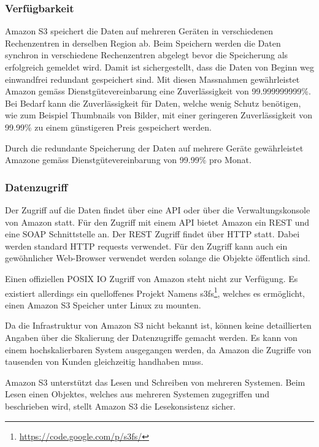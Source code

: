 \subsubsection*{Verfügbarkeit}
Amazon S3 speichert die Daten auf mehreren Geräten in verschiedenen Rechenzentren in derselben Region ab. Beim Speichern werden die Daten synchron in verschiedene Rechenzentren abgelegt bevor die Speicherung als erfolgreich gemeldet wird. Damit ist sichergestellt, dass die Daten von Beginn weg einwandfrei redundant gespeichert sind. Mit diesen Massnahmen gewährleistet Amazon gemäss Dienstgütevereinbarung eine Zuverlässigkeit von 99.999999999\%. Bei Bedarf kann die Zuverlässigkeit für Daten, welche wenig Schutz benötigen, wie zum Beispiel Thumbnails von Bilder, mit einer geringeren Zuverlässigkeit von 99.99\% zu einem günstigeren Preis gespeichert werden. \cite{Amazon2007}

Durch die redundante Speicherung der Daten auf mehrere Geräte gewährleistet Amazone gemäss Dienstgütevereinbarung von 99.99\% pro Monat.

\subsubsection*{Datenzugriff}
Der Zugriff auf die Daten findet über eine API oder über die Verwaltungskonsole von Amazon statt. Für den Zugriff mit einem API bietet Amazon ein \gls{REST} und eine \gls{SOAP} Schnittstelle an. Der \gls{REST} Zugriff findet über HTTP statt. Dabei werden standard HTTP requests verwendet. Für den Zugriff kann auch ein gewöhnlicher Web-Browser verwendet werden solange die Objekte öffentlich sind.

Einen offiziellen POSIX IO Zugriff von Amazon steht nicht zur Verfügung. Es existiert allerdings ein quelloffenes Projekt Namens s3fs\footnote{\url{https://code.google.com/p/s3fs/}}, welches es ermöglicht, einen Amazon S3 Speicher unter Linux zu mounten. \cite{S3fs}

Da die Infrastruktur von Amazon S3 nicht bekannt ist, können keine detaillierten Angaben über die Skalierung der Datenzugriffe gemacht werden. Es kann von einem hochskalierbaren System ausgegangen werden, da Amazon die Zugriffe von tausenden von Kunden gleichzeitig handhaben muss.

Amazon S3 unterstützt das Lesen und Schreiben von mehreren Systemen. Beim Lesen einen Objektes, welches aus mehreren Systemen zugegriffen und beschrieben wird, stellt Amazon S3 die Lesekonsistenz sicher. \cite{Amazon2012a}

